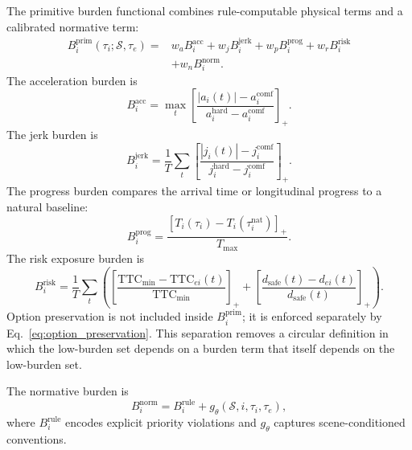 \documentclass[10pt]{article}
\begin{document}
The primitive burden functional combines rule-computable physical terms and a calibrated normative term:
\begin{equation}
\begin{aligned}
    B_i^{\mathrm{prim}}(\tau_i;\mathcal{S},\tau_e)
    =
    &
    w_a B^{\mathrm{acc}}_i
    +
    w_j B^{\mathrm{jerk}}_i
    +
    w_p B^{\mathrm{prog}}_i
    +
    w_r B^{\mathrm{risk}}_i \\
    &
    +
    w_n B^{\mathrm{norm}}_i .
\end{aligned}
\end{equation}
The acceleration burden is
\begin{equation}
    B^{\mathrm{acc}}_i
    =
    \max_t
    \left[
    \frac{|a_i(t)|-a^{\mathrm{comf}}_i}
    {a^{\mathrm{hard}}_i-a^{\mathrm{comf}}_i}
    \right]_+ .
\end{equation}
The jerk burden is
\begin{equation}
    B^{\mathrm{jerk}}_i
    =
    \frac{1}{T}
    \sum_t
    \left[
    \frac{|j_i(t)|-j^{\mathrm{comf}}_i}
    {j^{\mathrm{hard}}_i-j^{\mathrm{comf}}_i}
    \right]_+ .
\end{equation}
The progress burden compares the arrival time or longitudinal progress to a natural baseline:
\begin{equation}
    B^{\mathrm{prog}}_i
    =
    \frac{
    \left[
    T_i(\tau_i)-T_i(\tau_i^{\mathrm{nat}})
    \right]_+
    }{
    T_{\max}
    } .
\end{equation}
The risk exposure burden is
\begin{equation}
    B^{\mathrm{risk}}_i
    =
    \frac{1}{T}
    \sum_t
    \left(
    \left[
    \frac{\mathrm{TTC}_{\min}-\mathrm{TTC}_{ei}(t)}
    {\mathrm{TTC}_{\min}}
    \right]_+
    +
    \left[
    \frac{d_{\mathrm{safe}}(t)-d_{ei}(t)}
    {d_{\mathrm{safe}}(t)}
    \right]_+
    \right).
\end{equation}
Option preservation is not included inside $B_i^{\mathrm{prim}}$; it is enforced separately by Eq.~\eqref{eq:option_preservation}. This separation removes a circular definition in which the low-burden set depends on a burden term that itself depends on the low-burden set.

The normative burden is
\begin{equation}
    B^{\mathrm{norm}}_i
    =
    B^{\mathrm{rule}}_i
    +
    g_\theta(\mathcal{S},i,\tau_i,\tau_e),
\end{equation}
where $B^{\mathrm{rule}}_i$ encodes explicit priority violations and $g_\theta$ captures scene-conditioned conventions.
\end{document}
